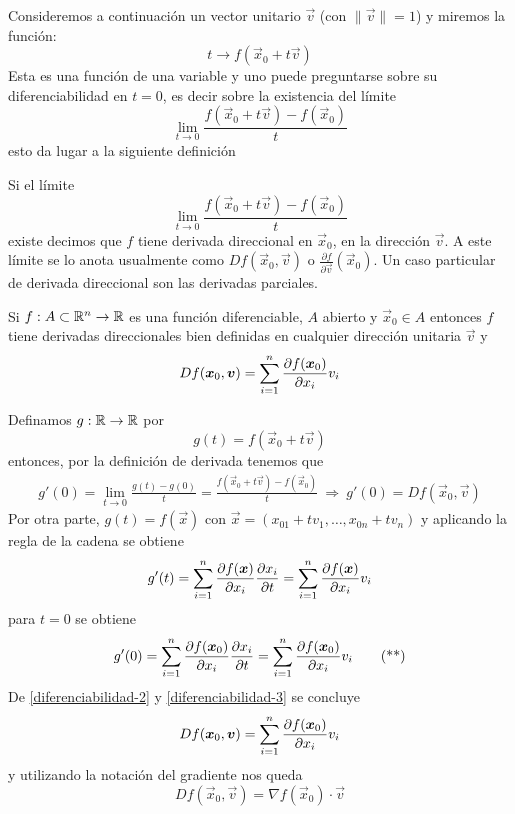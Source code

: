 Consideremos a continuaci\'on un vector unitario $  \vec{v} $ (con $
\|\vec{v}\|=1 $) y miremos la funci\'on:
\[ t\rightarrow f(\vec{x}_0+t\vec{v})\]
Esta es una funci\'on de una variable y uno puede preguntarse sobre
su diferenciabilidad en $t=0$, es decir sobre la existencia del l\'imite
$$ \lim_{t \to 0}\frac{f(\vec{x}_0+t\vec{v})-f(\vec{x}_0)}{t}$$
esto da lugar a la siguiente definici\'on

\begin{definicion}
Si el l\'imite
$$ \lim_{t \to 0}\frac{f(\vec{x}_0+t\vec{v})-f(\vec{x}_0)}{t}$$
existe decimos que $ f $ tiene derivada direccional en $\vec{x}_0$, en la direcci\'on $\vec{v}$. A este l\'imite se lo anota usualmente
como $ Df(\vec{x}_0,\vec{v}) $ o $ \frac{\partial f}{\partial \vec{v}}(\vec{x}_0) $. 
Un caso particular de derivada direccional son las derivadas parciales.
\end{definicion}

\begin{proposicion}\label{teorema-diferenciabilidad}
Si $f:A\subset \mathbb{R}^n \to \mathbb{R}$ es una funci\'on diferenciable, $A$ abierto 
y $\vec{x}_0\in A$ entonces $f$ tiene derivadas direccionales bien definidas en cualquier direcci\'on unitaria $\vec{v}$ y 
$$Df(\boldsymbol{x}_0,\boldsymbol{v})= \sum_{i=1}^n \frac{\partial f(\boldsymbol{x}_0)}{\partial x_i} v_i$$
\end{proposicion}

\begin{demostracion}
Definamos $g: \mathbb{R} \to \mathbb{R}$ por
$$g(t)=f(\vec{x}_0+t\vec{v})$$
entonces, por la definici\'on de derivada tenemos que
\begin{gather}\label{diferenciabilidad-2}
g'(0) = \lim_{t\to 0} \frac{g(t)-g(0)}{t}=\frac{f(\vec{x}_0+t\vec{v})-f(\vec{x}_0)}{t} \:\Rightarrow\: g'(0)= Df(\vec{x}_0,\vec{v}) \tag{*}
\end{gather}
Por otra parte, $g(t)=f(\vec{x})$ con $\vec{x}=(x_{01}+tv_1,\ldots , x_{0n}+tv_n)$ y aplicando la regla de la cadena se obtiene
$$g'(t)=\sum_{i=1}^n \frac{\partial f(\boldsymbol{x})}{\partial x_i}\frac{\partial x_i}{\partial t} = \sum_{i=1}^n \frac{\partial f(\boldsymbol{x})}{\partial x_i} v_i$$
para $t=0$ se obtiene
\begin{gather}\label{diferenciabilidad-3}
g'(0)=\sum_{i=1}^n \frac{\partial f(\boldsymbol{x}_0)}{\partial x_i}\frac{\partial x_i}{\partial t} = \sum_{i=1}^n \frac{\partial f(\boldsymbol{x}_0)}{\partial x_i} v_i \tag{**}
\end{gather}
De \eqref{diferenciabilidad-2} y \eqref{diferenciabilidad-3} se concluye
$$Df(\boldsymbol{x}_0,\boldsymbol{v}) = \sum_{i=1}^n \frac{\partial f(\boldsymbol{x}_0)}{\partial x_i} v_i$$
y utilizando la notaci\'on del gradiente nos queda
$$Df(\vec{x}_0,\vec{v}) = \nabla f(\vec{x}_0)\cdot \vec{v}$$
\end{demostracion}

